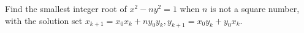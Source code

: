 Find the smallest integer root of $x^2-ny^2=1$ when $n$ is not a square number, with the solution set $x_{k+1} = x_0x_k + ny_0y_k, y_{k+1} = x_0y_k + y_0x_k$.


